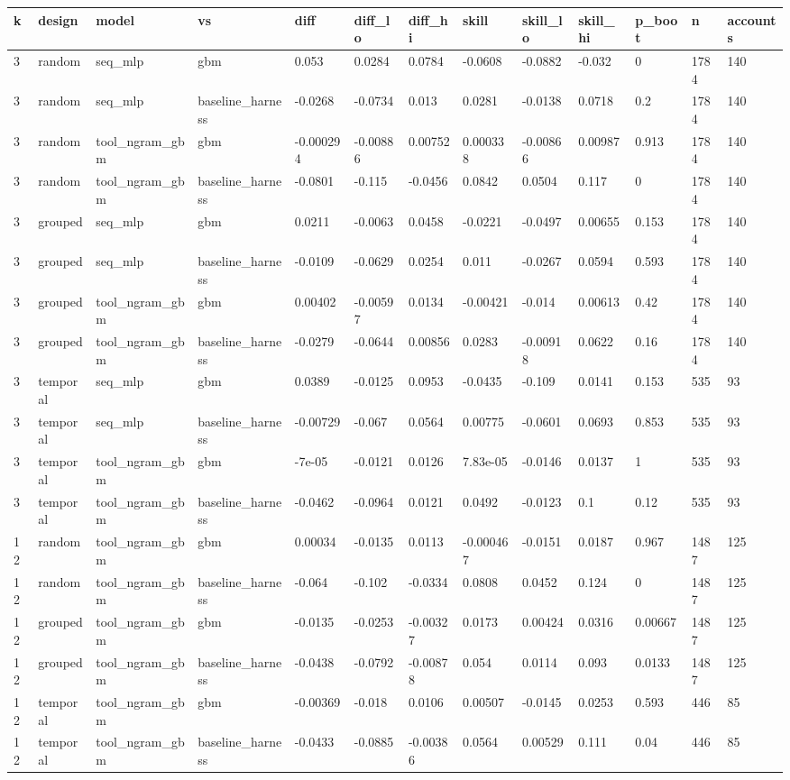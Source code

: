 \begin{tabular}{lllllllllllll}
\toprule
k & design & model & vs & diff & diff\_lo & diff\_hi & skill & skill\_lo & skill\_hi & p\_boot & n & accounts \\
\midrule
3 & random & seq\_mlp & gbm & 0.053 & 0.0284 & 0.0784 & -0.0608 & -0.0882 & -0.032 & 0 & 1784 & 140 \\
3 & random & seq\_mlp & baseline\_harness & -0.0268 & -0.0734 & 0.013 & 0.0281 & -0.0138 & 0.0718 & 0.2 & 1784 & 140 \\
3 & random & tool\_ngram\_gbm & gbm & -0.000294 & -0.00886 & 0.00752 & 0.000338 & -0.00866 & 0.00987 & 0.913 & 1784 & 140 \\
3 & random & tool\_ngram\_gbm & baseline\_harness & -0.0801 & -0.115 & -0.0456 & 0.0842 & 0.0504 & 0.117 & 0 & 1784 & 140 \\
3 & grouped & seq\_mlp & gbm & 0.0211 & -0.0063 & 0.0458 & -0.0221 & -0.0497 & 0.00655 & 0.153 & 1784 & 140 \\
3 & grouped & seq\_mlp & baseline\_harness & -0.0109 & -0.0629 & 0.0254 & 0.011 & -0.0267 & 0.0594 & 0.593 & 1784 & 140 \\
3 & grouped & tool\_ngram\_gbm & gbm & 0.00402 & -0.00597 & 0.0134 & -0.00421 & -0.014 & 0.00613 & 0.42 & 1784 & 140 \\
3 & grouped & tool\_ngram\_gbm & baseline\_harness & -0.0279 & -0.0644 & 0.00856 & 0.0283 & -0.00918 & 0.0622 & 0.16 & 1784 & 140 \\
3 & temporal & seq\_mlp & gbm & 0.0389 & -0.0125 & 0.0953 & -0.0435 & -0.109 & 0.0141 & 0.153 & 535 & 93 \\
3 & temporal & seq\_mlp & baseline\_harness & -0.00729 & -0.067 & 0.0564 & 0.00775 & -0.0601 & 0.0693 & 0.853 & 535 & 93 \\
3 & temporal & tool\_ngram\_gbm & gbm & -7e-05 & -0.0121 & 0.0126 & 7.83e-05 & -0.0146 & 0.0137 & 1 & 535 & 93 \\
3 & temporal & tool\_ngram\_gbm & baseline\_harness & -0.0462 & -0.0964 & 0.0121 & 0.0492 & -0.0123 & 0.1 & 0.12 & 535 & 93 \\
12 & random & tool\_ngram\_gbm & gbm & 0.00034 & -0.0135 & 0.0113 & -0.000467 & -0.0151 & 0.0187 & 0.967 & 1487 & 125 \\
12 & random & tool\_ngram\_gbm & baseline\_harness & -0.064 & -0.102 & -0.0334 & 0.0808 & 0.0452 & 0.124 & 0 & 1487 & 125 \\
12 & grouped & tool\_ngram\_gbm & gbm & -0.0135 & -0.0253 & -0.00327 & 0.0173 & 0.00424 & 0.0316 & 0.00667 & 1487 & 125 \\
12 & grouped & tool\_ngram\_gbm & baseline\_harness & -0.0438 & -0.0792 & -0.00878 & 0.054 & 0.0114 & 0.093 & 0.0133 & 1487 & 125 \\
12 & temporal & tool\_ngram\_gbm & gbm & -0.00369 & -0.018 & 0.0106 & 0.00507 & -0.0145 & 0.0253 & 0.593 & 446 & 85 \\
12 & temporal & tool\_ngram\_gbm & baseline\_harness & -0.0433 & -0.0885 & -0.00386 & 0.0564 & 0.00529 & 0.111 & 0.04 & 446 & 85 \\
\bottomrule
\end{tabular}